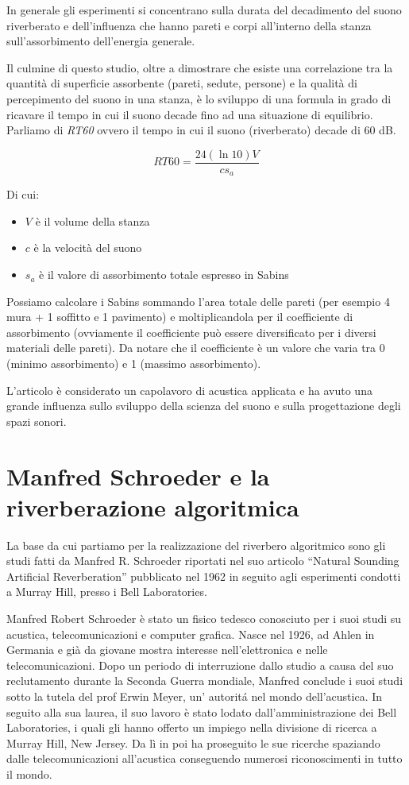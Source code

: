 In generale gli esperimenti si concentrano sulla durata del decadimento del suono riverberato e dell’influenza che hanno pareti e corpi all’interno della stanza sull’assorbimento dell’energia generale.

Il culmine di questo studio, oltre a dimostrare che esiste una correlazione tra la quantità di superficie assorbente (pareti, sedute, persone) e la qualità di percepimento del suono in una stanza, è lo sviluppo di una formula in grado di ricavare il tempo in cui il suono decade fino ad una situazione di equilibrio. 
Parliamo di \emph{RT60} ovvero il tempo in cui il suono (riverberato) decade di 60 dB.

\begin{equation}
RT60 = \frac{24(\ln{10})V}{c s_a}
\end{equation}

Di cui:
\begin{itemize}
\item $V$ è il volume della stanza
\item $c$ è la velocità del suono
\item $s_a$ è il valore di assorbimento totale espresso in Sabins
\end{itemize}

Possiamo calcolare i Sabins sommando l’area totale delle pareti (per esempio 4 mura + 1 soffitto e 1 pavimento) e moltiplicandola per il coefficiente di assorbimento (ovviamente il coefficiente può essere diversificato per i diversi materiali delle pareti). Da notare che il coefficiente è un valore che varia tra 0 (minimo assorbimento) e 1 (massimo assorbimento).

L’articolo è considerato un capolavoro di acustica applicata e ha avuto una grande influenza sullo sviluppo della scienza del suono e sulla progettazione degli spazi sonori.

\section{Manfred Schroeder e la riverberazione algoritmica}

La base da cui partiamo per la realizzazione del riverbero algoritmico sono gli studi fatti da Manfred R. Schroeder riportati nel suo articolo “Natural Sounding Artificial Reverberation” pubblicato nel 1962 in seguito agli esperimenti condotti a Murray Hill, presso i Bell Laboratories.

Manfred Robert Schroeder è stato un fisico tedesco conosciuto per i suoi studi su acustica, telecomunicazioni e computer grafica. Nasce nel 1926, ad Ahlen in Germania e già da giovane mostra interesse nell’elettronica e nelle telecomunicazioni. Dopo un periodo di interruzione dallo studio a causa del suo reclutamento durante la Seconda Guerra mondiale, Manfred conclude i suoi studi sotto la tutela del prof Erwin Meyer, un’ autoritá nel mondo dell’acustica. 
In seguito alla sua laurea, il suo lavoro è stato lodato dall’amministrazione dei Bell Laboratories, i quali gli hanno offerto un impiego nella divisione di ricerca a Murray Hill, New Jersey. Da lì in poi ha proseguito le sue ricerche spaziando dalle telecomunicazioni all’acustica conseguendo numerosi riconoscimenti in tutto il mondo.

